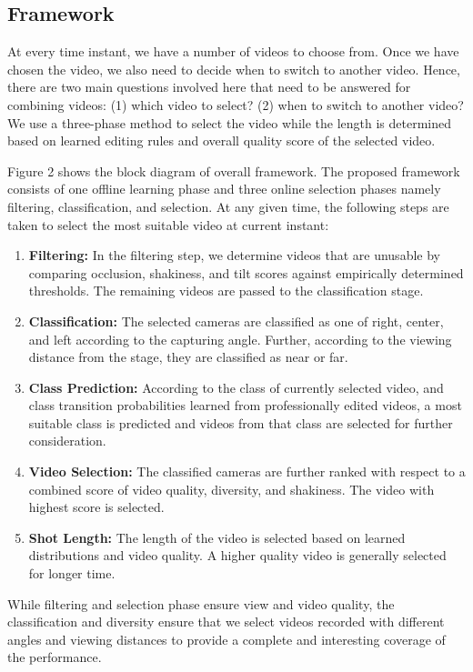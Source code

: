 \documentclass{sig-alternate-05-2015}
\begin{document}
\subsection{Framework}
At every time instant, we have a number of videos to choose
from. Once we have chosen the video, we also need to decide when
to switch to another video. Hence, there are two main questions
involved here that need to be answered for combining videos: (1)
which video to select? (2) when to switch to another video? We
use a three-phase method to select the video while the length is
determined based on learned editing rules and overall quality score
of the selected video.

Figure 2 shows the block diagram of overall framework. The
proposed framework consists of one offline learning phase and three
online selection phases namely filtering, classification, and selection. At any given time, the following steps are taken to select the
most suitable video at current instant:
\begin{enumerate}
\item \textbf{Filtering:} In the filtering step, we determine videos that are
unusable by comparing occlusion, shakiness, and tilt scores
against empirically determined thresholds. The remaining
videos are passed to the classification stage.
\item \textbf{Classification:} The selected cameras are classified as one
of right, center, and left according to the capturing angle.
Further, according to the viewing distance from the stage,
they are classified as near or far.
\item \textbf{Class Prediction:} According to the class of currently selected video, and class transition probabilities learned from
professionally edited videos, a most suitable class is predicted and videos from that class are selected for further consideration.
\item \textbf{Video Selection:} The classified cameras are further ranked
with respect to a combined score of video quality, diversity,
and shakiness. The video with highest score is selected.
\item \textbf{Shot Length:} The length of the video is selected based on
learned distributions and video quality. A higher quality video
is generally selected for longer time.
\end{enumerate}
While filtering and selection phase ensure view and video quality, the classification and diversity ensure that we select videos
recorded with different angles and viewing distances to provide a
complete and interesting coverage of the performance. 
\end{document}
